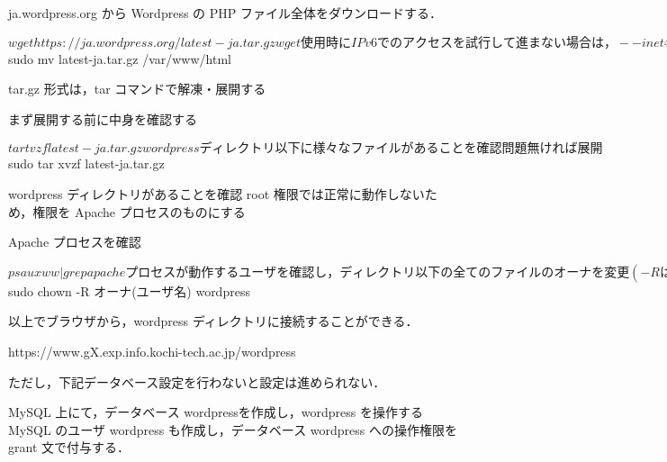 \begin{cli}
ja.wordpress.org から Wordpress の PHP ファイル全体をダウンロードする．

$ wget https://ja.wordpress.org/latest-ja.tar.gz

  wget 使用時に IPv6 でのアクセスを試行して進まない場合は，
  --inet4-only オプションを付与して実行することで IPv4 での
  転送を強制させるとよい

ファイルをWWW公開ディレクトリに移動する

$ sudo mv latest-ja.tar.gz /var/www/html

  tar.gz 形式は，tar コマンドで解凍・展開する

まず展開する前に中身を確認する

$ tar tvzf latest-ja.tar.gz

  wordpress ディレクトリ以下に様々なファイルがあることを確認
  問題無ければ展開

$ sudo tar xvzf latest-ja.tar.gz

  wordpress ディレクトリがあることを確認
  root 権限では正常に動作しないため，権限を Apache プロセスのものにする

Apache プロセスを確認

$ ps auxww | grep apache

  プロセスが動作するユーザを確認し，ディレクトリ以下の全てのファイルの
  オーナを変更(-R は recursive 再帰的に全てのファイルを変更)

$ sudo chown -R オーナ(ユーザ名) wordpress
\end{cli}

以上でブラウザから，wordpress ディレクトリに接続することができる．

\begin{cli}
https://www.gX.exp.info.kochi-tech.ac.jp/wordpress
\end{cli}

ただし，下記データベース設定を行わないと設定は進められない．
%

MySQL 上にて，データベース wordpressを作成し，wordpress を操作する MySQL のユーザ wordpress も作成し，データベース wordpress への操作権限を　grant 文で付与する．


